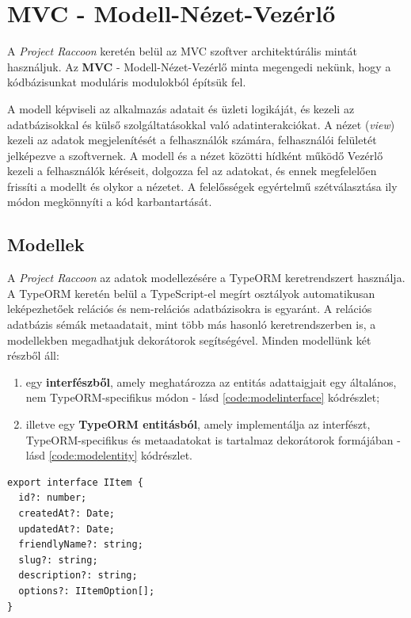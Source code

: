 \pagebreak

\section{MVC - Modell-Nézet-Vezérlő}

A \textit{Project Raccoon} keretén belül az MVC szoftver architektúrális mintát használjuk. Az \textbf{MVC} - Modell-Nézet-Vezérlő minta megengedi nekünk, hogy a kódbázisunkat moduláris modulokból építsük fel.

A modell képviseli az alkalmazás adatait és üzleti logikáját, és kezeli az adatbázisokkal és külső szolgáltatásokkal való adatinterakciókat. A nézet (\textit{view}) kezeli az adatok megjelenítését a felhasználók számára, felhasználói felületét jelképezve a szoftvernek. A modell és a nézet közötti hídként működő Vezérlő kezeli a felhasználók kéréseit, dolgozza fel az adatokat, és ennek megfelelően frissíti a modellt és olykor a nézetet. A felelősségek egyértelmű szétválasztása ily módon megkönnyíti a kód karbantartását.

\subsection{Modellek}

A \textit{Project Raccoon} az adatok modellezésére a TypeORM keretrendszert használja. A TypeORM keretén belül a TypeScript-el megírt osztályok automatikusan leképezhetőek relációs és nem-relációs adatbázisokra is egyaránt. A relációs adatbázis sémák metaadatait, mint több más hasonló keretrendszerben is, a modellekben megadhatjuk dekorátorok segítségével. Minden modellünk két részből áll:

\begin{enumerate}
  \item egy \textbf{interfészből}, amely meghatározza az entitás adattaigjait egy általános, nem TypeORM-specifikus módon - lásd \ref{code:modelinterface} kódrészlet;
  \item illetve egy \textbf{TypeORM entitásból}, amely implementálja az interfészt, TypeORM-specifikus és metaadatokat is tartalmaz dekorátorok formájában - lásd \ref{code:modelentity} kódrészlet.
\end{enumerate}

\begin{lstlisting}[caption={ Egy modell interfészének megvalósítása }, captionpos=b, language = TS, label={code:modelinterface}]
export interface IItem {
  id?: number;
  createdAt?: Date;
  updatedAt?: Date;
  friendlyName?: string;
  slug?: string;
  description?: string;
  options?: IItemOption[];
}
\end{lstlisting}

